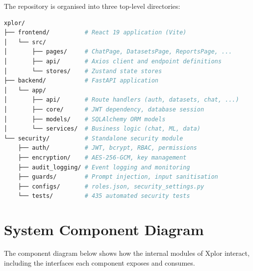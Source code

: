 \documentclass[12pt,a4paper]{report}
\begin{document}
The repository is organised into three top-level directories:

\begin{lstlisting}[language=bash, caption={High-level directory structure}]
xplor/
├── frontend/          # React 19 application (Vite)
│   └── src/
│       ├── pages/     # ChatPage, DatasetsPage, ReportsPage, ...
│       ├── api/       # Axios client and endpoint definitions
│       └── stores/    # Zustand state stores
├── backend/           # FastAPI application
│   └── app/
│       ├── api/       # Route handlers (auth, datasets, chat, ...)
│       ├── core/      # JWT dependency, database session
│       ├── models/    # SQLAlchemy ORM models
│       └── services/  # Business logic (chat, ML, data)
└── security/          # Standalone security module
    ├── auth/          # JWT, bcrypt, RBAC, permissions
    ├── encryption/    # AES-256-GCM, key management
    ├── audit_logging/ # Event logging and monitoring
    ├── guards/        # Prompt injection, input sanitisation
    ├── configs/       # roles.json, security_settings.py
    └── tests/         # 435 automated security tests
\end{lstlisting}

\section{System Component Diagram}

The component diagram below shows how the internal modules of Xplor interact, including the interfaces each component exposes and consumes.
\end{document}
